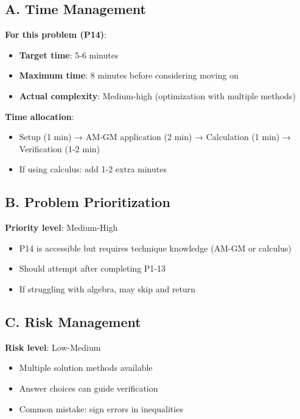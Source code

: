 \documentclass[12pt]{article}
\begin{document}
\begin{competitionbox}
\subsection*{A. Time Management}

\textbf{For this problem (P14)}:
\begin{itemize}[leftmargin=*]
    \item \textbf{Target time}: 5-6 minutes
    \item \textbf{Maximum time}: 8 minutes before considering moving on
    \item \textbf{Actual complexity}: Medium-high (optimization with multiple methods)
\end{itemize}

\textbf{Time allocation}:
\begin{itemize}[leftmargin=*]
    \item Setup (1 min) → AM-GM application (2 min) → Calculation (1 min) → Verification (1-2 min)
    \item If using calculus: add 1-2 extra minutes
\end{itemize}

\subsection*{B. Problem Prioritization}

\textbf{Priority level}: Medium-High
\begin{itemize}[leftmargin=*]
    \item P14 is accessible but requires technique knowledge (AM-GM or calculus)
    \item Should attempt after completing P1-13
    \item If struggling with algebra, may skip and return
\end{itemize}

\subsection*{C. Risk Management}

\textbf{Risk level}: Low-Medium
\begin{itemize}[leftmargin=*]
    \item Multiple solution methods available
    \item Answer choices can guide verification
    \item Common mistake: sign errors in inequalities
\end{itemize}


\end{competitionbox}
\end{document}
